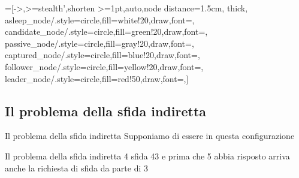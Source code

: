 =[->,>=stealth',shorten >=1pt,auto,node distance=1.5cm,
  thick,
  asleep_node/.style={circle,fill=white!20,draw,font=\sffamily\Large\bfseries},
  candidate_node/.style={circle,fill=green!20,draw,font=\sffamily\Large\bfseries},
  passive_node/.style={circle,fill=gray!20,draw,font=\sffamily\Large\bfseries},
  captured_node/.style={circle,fill=blue!20,draw,font=\sffamily\Large\bfseries},
  follower_node/.style={circle,fill=yellow!20,draw,font=\sffamily\Large\bfseries},
  leader_node/.style={circle,fill=red!50,draw,font=\sffamily\Large\bfseries},]

  \subsection{Il problema della sfida indiretta}
\begin{frame}{Il problema della sfida indiretta}
Supponiamo di essere in questa configurazione


\begin{center}
\end{center} 
\end{frame}

\begin{frame}{Il problema della sfida indiretta}
 4 sfida 43 e prima che 5 abbia risposto arriva anche la richiesta di sfida da parte di 3

\begin{center}
\end{center}
\end{frame}


